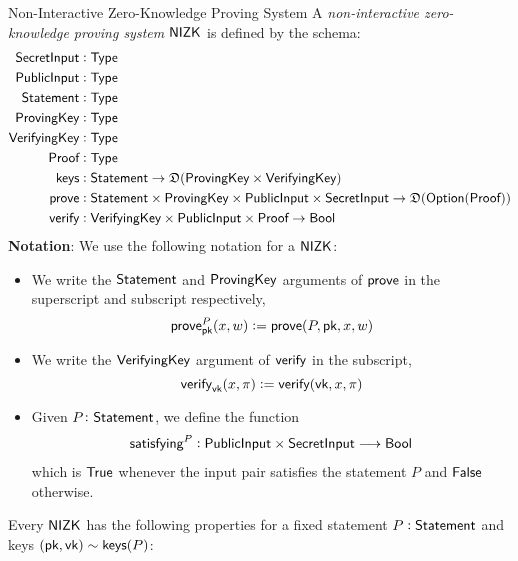 \begin{definitiontoc}{Non-Interactive Zero-Knowledge Proving System}
    A \emph{non-interactive zero-knowledge proving system} ${\textsf{NIZK}}$ is defined by the schema:
    \begin{align*}
        {\textsf{SecretInput}}  &: {\textsf{Type}} \\
        {\textsf{PublicInput}}  &: {\textsf{Type}} \\
        {\textsf{Statement}}    &: {\textsf{Type}} \\
        {\textsf{ProvingKey}}   &: {\textsf{Type}} \\
        {\textsf{VerifyingKey}} &: {\textsf{Type}} \\
        {\textsf{Proof}}        &: {\textsf{Type}} \\
        {\textsf{keys}}         &: {\textsf{Statement}} \to \mathfrak{D}({\textsf{ProvingKey}} \times {\textsf{VerifyingKey}}) \\
        {\textsf{prove}}        &: {\textsf{Statement}} \times {\textsf{ProvingKey}} \times {\textsf{PublicInput}} \times {\textsf{SecretInput}} \to \mathfrak{D}({\textsf{Option}}({\textsf{Proof}})) \\
        {\textsf{verify}}       &: {\textsf{VerifyingKey}} \times {\textsf{PublicInput}} \times {\textsf{Proof}} \to {\textsf{Bool}}
    \end{align*}
    \textbf{Notation}: We use the following notation for a ${\textsf{NIZK}}$:
    \begin{itemize}
        \item We write the ${\textsf{Statement}}$ and ${\textsf{ProvingKey}}$ arguments of ${\textsf{prove}}$ in the superscript and subscript respectively,
            \[{\textsf{prove}}^P_{\textsf{pk}}(x, w) := {\textsf{prove}}(P, {\textsf{pk}}, x, w)\]
        \item We write the ${\textsf{VerifyingKey}}$ argument of ${\textsf{verify}}$ in the subscript,
            \[{\textsf{verify}}_{\textsf{vk}}(x, \pi) := {\textsf{verify}}({\textsf{vk}}, x, \pi)\]
        \item Given $P \colon {\textsf{Statement}}$, we define the function
        \begin{align*}
            {\textsf{satisfying}}^P : {\textsf{PublicInput}} \times {\textsf{SecretInput}} \longrightarrow {\textsf{Bool}}
        \end{align*}
        which is ${\textsf{True}}$ whenever the input pair satisfies the statement $P$ and ${\textsf{False}}$ otherwise.
    \end{itemize}

    Every ${\textsf{NIZK}}$ has the following properties for a fixed statement $P : {\textsf{Statement}}$ and keys $({\textsf{pk}}, {\textsf{vk}}) \sim {\textsf{keys}}(P)$:


\end{definitiontoc}
